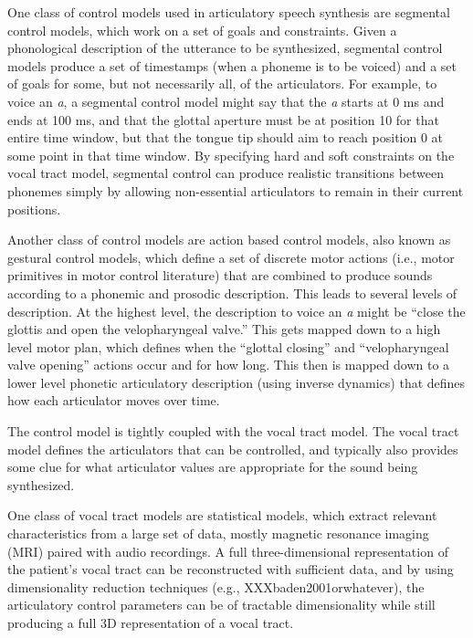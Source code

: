\documentclass{article}
\begin{document}
One class of control models used in
articulatory speech synthesis
are segmental control models,
which work on a set of goals and constraints.
Given a phonological description
of the utterance to be synthesized,
segmental control models
produce a set of timestamps
(when a phoneme is to be voiced)
and a set of goals for some,
but not necessarily all,
of the articulators.
For example, to voice an \textit{a},
a segmental control model might say
that the \textit{a} starts at 0 ms
and ends at 100 ms,
and that the glottal aperture
must be at position 10
for that entire time window,
but that the tongue tip
should aim to reach position 0
at some point in that time window.
By specifying hard and soft constraints
on the vocal tract model,
segmental control can produce
realistic transitions between
phonemes simply by allowing
non-essential articulators to
remain in their current positions.

Another class of control models are
action based control models,
also known as gestural control models,
which define a set of discrete motor actions
(i.e., motor primitives in motor control literature)
that are combined to produce sounds according
to a phonemic and prosodic description.
This leads to several levels of description.
At the highest level,
the description to voice an \textit{a}
might be
``close the glottis
and open the velopharyngeal valve.''
This gets mapped down to a
high level motor plan,
which defines when the ``glottal closing''
and ``velopharyngeal valve opening''
actions occur and for how long.
This then is mapped down
to a lower level phonetic articulatory description
(using inverse dynamics)
that defines how each articulator
moves over time.

The control model is tightly coupled
with the vocal tract model.
The vocal tract model defines
the articulators that can be controlled,
and typically also provides some clue
for what articulator values
are appropriate for the
sound being synthesized.

One class of vocal tract models
are statistical models,
which extract relevant characteristics
from a large set of data,
mostly magnetic resonance imaging (MRI)
paired with audio recordings.
A full three-dimensional representation
of the patient's vocal tract
can be reconstructed with sufficient data,
and by using dimensionality reduction techniques
(e.g., XXXbaden2001orwhatever),
the articulatory control parameters
can be of tractable dimensionality
while still producing a full
3D representation of a vocal tract.
\end{document}
